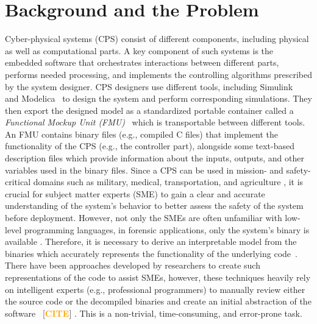 \documentclass[sigconf,review]{acmart}
\renewcommand{\hl}[1]{#1}
\newcommand{\citeme}[1]{%
  \begingroup
  \definecolor{hlcolor}{RGB}{255, 226, 176}\sethlcolor{hlcolor}%
  [\textcolor{orange}{\hl{\textbf{CITE}}}]%
  \endgroup
}
\begin{document}
\section{Background and the Problem}
\label{sec:Introduction}
Cyber-physical systems (CPS) consist of different components, including physical as well as computational parts. A key component of such systems is the embedded software that orchestrates interactions between different parts, performs needed processing, and implements the controlling algorithms prescribed by the system designer.
%
CPS designers use different tools, including Simulink~\cite{documentationsimulation} and Modelica~\cite{fritzson2006openmodelica} to design the system and perform corresponding simulations. They then export the designed model as a standardized portable container called a  \textit{Functional Mockup Unit (FMU)}~\cite{blochwitz2011functional} which is transportable between different tools. An FMU contains binary files (e.g., compiled C files) that implement the functionality of the CPS (e.g., the controller part), alongside some text-based description files which provide information about the inputs, outputs, and other variables used in the binary files. 
%
Since a CPS can be used in mission- and safety-critical domains such as military, medical, transportation, and agriculture \cite{serpanos2018cyber}, it is crucial for subject matter experts (SME) to gain a clear and accurate understanding of the system's behavior to better assess the safety of the system before deployment.
%
However, not only the SMEs are often unfamiliar with low-level programming languages, in forensic applications, only the system's binary is available \cite{ming2016straighttaint}. Therefore, it is necessary to derive an interpretable model from the binaries which accurately represents the functionality of the underlying code~\cite{shbita2022automated}. 
%
There have been approaches developed by researchers to create such representations of the code to assist SMEs, however, these techniques heavily rely on intelligent experts (e.g., professional programmers) to manually review either the source code or the decompiled binaries and create an initial abstraction of the software~\citeme{}. This is a non-trivial, time-consuming, and error-prone task. 
\end{document}
